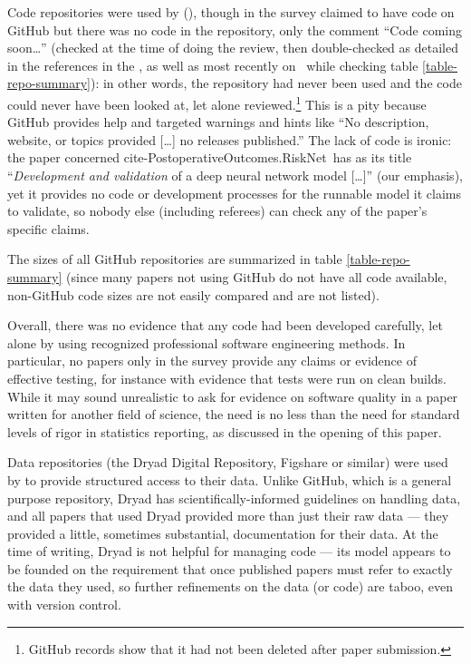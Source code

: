 Code repositories were used by  (\pc{\countUsesVersionControlRepository}{\dataN}), though  in the survey claimed to have code on GitHub but there was no code in the repository, only the comment ``Code coming soon\ldots'' (checked at the time of doing the review, then double-checked as detailed in the references in the \supplement, as well as most recently on \clonedate\
while checking table \ref{table-repo-summary}): in other words, the repository had never been used and the code could never have been looked at, let alone reviewed.\footnote{GitHub records show that it had not been deleted after paper submission.} This is a pity because GitHub provides help and targeted warnings and hints like ``No description, website, or topics provided [\ldots] no releases published.'' The lack of code is ironic: the paper concerned \csname cite-PostoperativeOutcomes.RiskNet\endcsname\ has as its title ``\emph{Development and validation\/} of a deep neural network model [\ldots]'' (our emphasis), yet it provides no code or development processes for the runnable model it claims to validate, so nobody else (including referees) can check any of the paper's specific claims.

The sizes of all GitHub repositories are summarized in table \ref{table-repo-summary} (since many papers not using GitHub do not have all code available, non-GitHub code sizes are not easily compared and are not listed). 

Overall, there was no evidence that any code had been developed carefully, {let alone by using recognized professional software engineering methods}. In particular, 
\ifnum \countCodetested=0
no papers
\else only 
\fi in the survey provide any claims or evidence of effective testing, for instance with evidence that tests were run on clean builds. {While it may sound unrealistic to ask for evidence on software quality in a paper written for another field of science, the need is no less than the need for standard levels of rigor in statistics reporting, as discussed in the opening of this paper.}

Data repositories (the Dryad Digital Repository, Figshare or similar) were used by  to provide structured access to their data. Unlike GitHub, which is a general purpose repository, Dryad has scientifically-informed guidelines on handling data, and all papers that used Dryad provided more than just their raw data --- they provided a little, sometimes substantial, documentation for their data. At the time of writing, Dryad is not helpful for managing code --- its model appears to be founded on the requirement that once published papers must refer to exactly the data they used, so further refinements on the data (or code) are taboo, even with version control.

